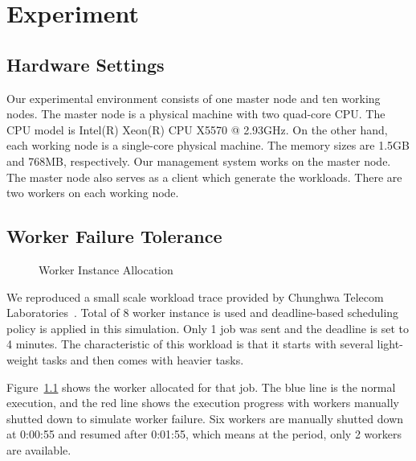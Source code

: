 \chapter{Experiment}\label{chap:exp}

\section{Hardware Settings}

Our experimental environment consists of one master node and ten working
nodes.
The master node is a physical machine with two quad-core CPU.
The CPU model is Intel(R) Xeon(R) CPU X5570 @ 2.93GHz.
On the other hand, each working node is a single-core physical machine.
The memory sizes are 1.5GB and 768MB, respectively.
Our management system works on the master node.
The master node also serves as a client which generate the workloads.
There are two workers on each working node.

\section{Worker Failure Tolerance}

\begin{figure}
  \caption{Worker Instance Allocation}
  \label{figure:worker-failure}
\end{figure}

We reproduced a small scale workload trace provided by Chunghwa Telecom
Laboratories~\cite{cite:cht-lab}.
Total of 8 worker instance is used and deadline-based scheduling policy
is applied in this simulation.
Only 1 job was sent and the deadline is set to 4 minutes.
The characteristic of this workload is that it starts with several
light-weight tasks and then comes with heavier tasks.

Figure~\ref{figure:worker-failure} shows the worker allocated for that
job.
The blue line is the normal execution, and the red line shows the
execution progress with workers manually shutted down to simulate worker
failure.
Six workers are manually shutted down at 0:00:55 and resumed after
0:01:55, which means at the period, only 2 workers are available.

